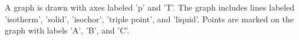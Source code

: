 A graph is drawn with axes labeled 'p' and 'T'. The graph includes lines labeled 'isotherm', 'solid', 'isochor', 'triple point', and 'liquid'. Points are marked on the graph with labels 'A', 'B', and 'C'.